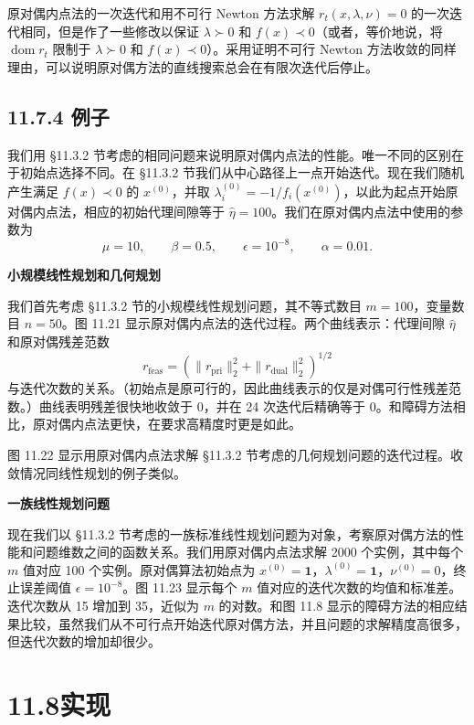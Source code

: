 \documentclass[UTF8, 12pt, fontset=fandol, oneside]{ctexart}
\begin{document}
原对偶内点法的一次迭代和用不可行 Newton 方法求解 $r_t(x,\lambda,\nu)=0$ 的一次迭代相同，但是作了一些修改以保证 $\lambda\succ0$ 和 $f(x)\prec0$（或者，等价地说，将 $\operatorname{dom}r_t$ 限制于 $\lambda\succ0$ 和 $f(x)\prec0$）。采用证明不可行 Newton 方法收敛的同样理由，可以说明原对偶方法的直线搜索总会在有限次迭代后停止。

\subsection*{11.7.4 例子}

我们用 \S 11.3.2 节考虑的相同问题来说明原对偶内点法的性能。唯一不同的区别在于初始点选择不同。在 \S 11.3.2 节我们从中心路径上一点开始迭代。现在我们随机产生满足 $f(x)\prec0$ 的 $x^{(0)}$，并取 $\lambda_i^{(0)}=-1/f_i(x^{(0)})$，以此为起点开始原对偶内点法，相应的初始代理间隙等于 $\hat{\eta}=100$。我们在原对偶内点法中使用的参数为
\[
\mu=10,\qquad \beta=0.5,\qquad \epsilon=10^{-8},\qquad \alpha=0.01.
\]

\noindent\textbf{小规模线性规划和几何规划}

我们首先考虑 \S 11.3.2 节的小规模线性规划问题，其不等式数目 $m=100$，变量数目 $n=50$。图 11.21 显示原对偶内点法的迭代过程。两个曲线表示：代理间隙 $\hat{\eta}$ 和原对偶残差范数
\[
r_{\mathrm{feas}}=\left(\|r_{\mathrm{pri}}\|_2^2+\|r_{\mathrm{dual}}\|_2^2\right)^{1/2}
\]
与迭代次数的关系。（初始点是原可行的，因此曲线表示的仅是对偶可行性残差范数。）曲线表明残差很快地收敛于 0，并在 24 次迭代后精确等于 0。和障碍方法相比，原对偶内点法更快，在要求高精度时更是如此。

图 11.22 显示用原对偶内点法求解 \S 11.3.2 节考虑的几何规划问题的迭代过程。收敛情况同线性规划的例子类似。

\noindent\textbf{一族线性规划问题}

现在我们以 \S 11.3.2 节考虑的一族标准线性规划问题为对象，考察原对偶方法的性能和问题维数之间的函数关系。我们用原对偶内点法求解 2000 个实例，其中每个 $m$
值对应 100 个实例。原对偶算法初始点为 $x^{(0)}=\mathbf{1}$，$\lambda^{(0)}=\mathbf{1}$，$\nu^{(0)}=0$，终止误差阈值 $\epsilon=10^{-8}$。图 11.23 显示每个 $m$ 值对应的迭代次数的均值和标准差。迭代次数从 15 增加到 35，近似为 $m$ 的对数。和图 11.8 显示的障碍方法的相应结果比较，虽然我们从不可行点开始迭代原对偶方法，并且问题的求解精度高很多，但迭代次数的增加却很少。

\section*{11.8\quad 实现}
\end{document}
